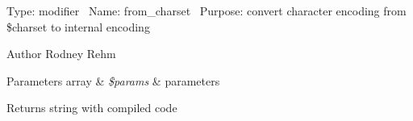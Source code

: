 Type\+: modifier~\newline
 Name\+: from\+\_\+charset~\newline
 Purpose\+: convert character encoding from \$charset to internal encoding

\begin{DoxyAuthor}{Author}
Rodney Rehm 
\end{DoxyAuthor}

\begin{DoxyParams}[1]{Parameters}
array & {\em \$params} & parameters \\
\hline
\end{DoxyParams}
\begin{DoxyReturn}{Returns}
string with compiled code 
\end{DoxyReturn}
